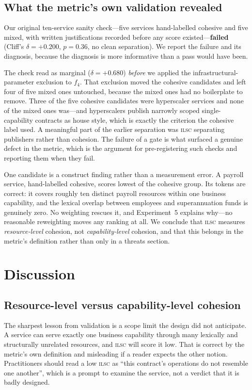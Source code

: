 \documentclass[journal]{IEEEtran}
\newcommand{\ilsc}{\textsc{ilsc}}
\begin{document}
\subsection{What the metric's own validation revealed}
\label{sec:res-gate}
Our original ten-service sanity check---five services hand-labelled cohesive and
five mixed, with written justifications recorded before any score
existed---\textbf{failed} (Cliff's $\delta = +0.200$, $p = 0.36$, no clean
separation). We report the failure and its diagnosis, because the diagnosis is
more informative than a pass would have been.

The check read as marginal ($\delta = +0.680$) \emph{before} we applied the
infrastructural-parameter exclusion to $f_4$. That exclusion moved the cohesive
candidates and left four of five mixed ones untouched, because the mixed ones
had no boilerplate to remove. Three of the five cohesive candidates were
hyperscaler services and none of the mixed ones was---and hyperscalers publish
narrowly scoped single-capability contracts as house style, which is exactly
the criterion the cohesive label used. A meaningful part of the earlier
separation was \ilsc{} separating publishers rather than cohesion. The failure
of a gate is what surfaced a genuine defect in the metric, which is the argument
for pre-registering such checks and reporting them when they fail.

One candidate is a construct finding rather than a measurement error. A payroll
service, hand-labelled cohesive, scores lowest of the cohesive group. Its tokens
are correct: it covers roughly ten distinct payroll resources within one business
capability, and the lexical overlap between employees and superannuation funds
is genuinely zero. No weighting rescues it, and Experiment~5 explains why---no
reasonable reweighting moves any ranking at all. We conclude that \ilsc{}
measures \emph{resource-level} cohesion, not \emph{capability-level} cohesion,
and that this belongs in the metric's definition rather than only in a threats
section.

\section{Discussion}
\label{sec:discussion}

\subsection{Resource-level versus capability-level cohesion}
The sharpest lesson from validation is a scope limit the design did not
anticipate. A service can serve exactly one business capability through many
lexically and structurally unrelated resources, and \ilsc{} will score it low.
That is correct by the metric's own definition and misleading if a reader
expects the other notion. Practitioners should read a low \ilsc{} as ``this
contract's operations do not resemble one another'', which is a prompt to
examine the service, not a verdict that it is badly designed.
\end{document}
